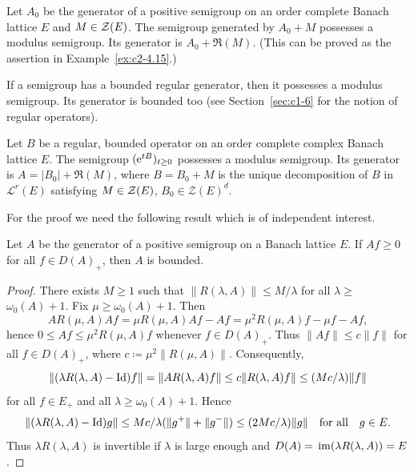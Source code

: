 \begin{example}\label{ex:c2-4.16}
Let $A_{0}$ be the generator of a positive semigroup on an order complete Banach lattice $E$ and $M \in \mathcal{Z}(E)$.
The semigroup generated by $A_{0} + M$ possesses a modulus semigroup. Its generator is $A_{0} + \Re(M)$. (This can be proved as the assertion in Example~\ref{ex:c2-4.15}.)
\end{example}
If a semigroup has a bounded regular generator, then it possesses a modulus semigroup. Its generator is bounded too (see Section~\ref{sec:c1-6} for the notion of regular operators).
\begin{theorem}\label{thm:c2-4.17}
Let $B$ be a regular, bounded operator on an order complete complex Banach lattice $E$. The semigroup $(\eu^{tB})_{t \geq 0}$ possesses a modulus semigroup. Its generator is $A = |B_{0}| + \Re(M)$, where $B = B_{0} + M$ is the unique decomposition of\/ $B$ in $\mathcal{L}^{r}(E)$ satisfying $M \in \mathcal{Z}(E)$, $B_{0} \in \mathcal{Z}(E)^{d}$.
\end{theorem}
For the proof we need the following result which is of independent interest.
\begin{lemma}\label{lem:c2-4.18}
Let $A$ be the generator of a positive semigroup on a Banach lattice $E$. 
If\/ $Af \geq 0$ for all $f \in D(A)_{+}$, then $A$ is bounded.
\end{lemma}
\begin{proof}%
There exists $M \geq 1$ such that $\|R(\lambda,A)\| \leq M/\lambda$ for all $\lambda \geq$ $\omega_{0}(A)+1$.
Fix $\mu \geq \omega_{0}(A)+1$.
Then 
\[
AR(\mu,A)Af = \mu R(\mu,A)Af - Af = \mu^{2}R(\mu,A)f - \mu f - Af ,
\]
hence $0 \leq Af \leq \mu^{2}R(\mu,A)f$ whenever $f \in D(A)_{+}$.
Thus $\|Af\| \leq c\|f\|$ for all $f \in D(A)_{+}$, where $c \coloneq \mu^{2}\|R(\mu,A)\|$.
Consequently,
\[
\|(\lambda R(\lambda,A) - \Id)f\| = \|AR(\lambda,A)f\| \leq c\|R(\lambda,A)f\| \leq (Mc/\lambda)\|f\| 
\]
for all $f \in E_{+}$ and all $ \lambda \geq \omega_{0}(A)+1$. 
Hence
\[
\|(\lambda R(\lambda,A) - \Id)g\| \leq Mc/\lambda(\|g^{+}\| + \|g^{-}\|) \leq (2Mc/\lambda)\|g\| \quad \text{for all} \quad g \in E .
\]
Thus $\lambda R(\lambda,A)$ is invertible if\/ $\lambda$ is large enough and
$D(A) = \mathop{}\mathrm{im}(\lambda R(\lambda,A)) = E$.
\end{proof}
